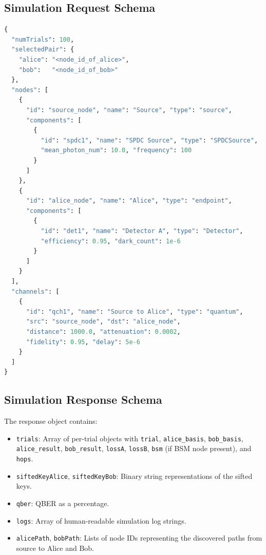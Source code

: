 \documentclass[12pt,oneside,letterpaper,english]{article}
\begin{document}
\subsection{Simulation Request Schema}

\begin{lstlisting}[language=Python, caption={Full simulation request JSON schema}]
{
  "numTrials": 100,
  "selectedPair": {
    "alice": "<node_id_of_alice>",
    "bob":   "<node_id_of_bob>"
  },
  "nodes": [
    {
      "id": "source_node", "name": "Source", "type": "source",
      "components": [
        {
          "id": "spdc1", "name": "SPDC Source", "type": "SPDCSource",
          "mean_photon_num": 10.0, "frequency": 100
        }
      ]
    },
    {
      "id": "alice_node", "name": "Alice", "type": "endpoint",
      "components": [
        {
          "id": "det1", "name": "Detector A", "type": "Detector",
          "efficiency": 0.95, "dark_count": 1e-6
        }
      ]
    }
  ],
  "channels": [
    {
      "id": "qch1", "name": "Source to Alice", "type": "quantum",
      "src": "source_node", "dst": "alice_node",
      "distance": 1000.0, "attenuation": 0.0002,
      "fidelity": 0.95, "delay": 5e-6
    }
  ]
}
\end{lstlisting}

\subsection{Simulation Response Schema}

The response object contains:
\begin{itemize}
    \item \texttt{trials}: Array of per-trial objects with \texttt{trial}, \texttt{alice\_basis}, \texttt{bob\_basis}, \texttt{alice\_result}, \texttt{bob\_result}, \texttt{lossA}, \texttt{lossB}, \texttt{bsm} (if BSM node present), and \texttt{hops}.
    \item \texttt{siftedKeyAlice}, \texttt{siftedKeyBob}: Binary string representations of the sifted keys.
    \item \texttt{qber}: QBER as a percentage.
    \item \texttt{logs}: Array of human-readable simulation log strings.
    \item \texttt{alicePath}, \texttt{bobPath}: Lists of node IDs representing the discovered paths from source to Alice and Bob.
\end{itemize}

\end{document}
